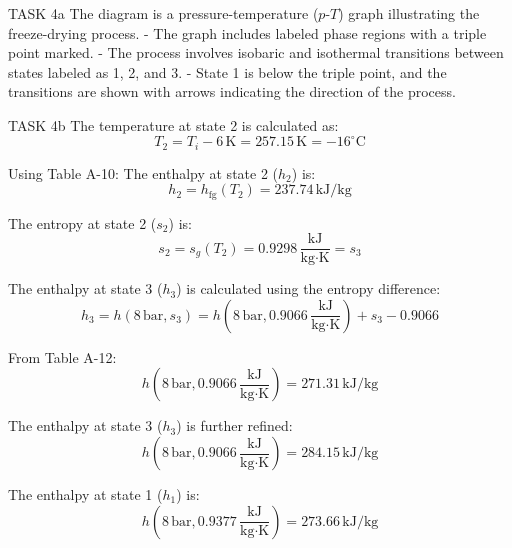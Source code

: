 TASK 4a  
The diagram is a pressure-temperature (\(p\)-\(T\)) graph illustrating the freeze-drying process.  
- The graph includes labeled phase regions with a triple point marked.  
- The process involves isobaric and isothermal transitions between states labeled as 1, 2, and 3.  
- State 1 is below the triple point, and the transitions are shown with arrows indicating the direction of the process.  

TASK 4b  
The temperature at state 2 is calculated as:  
\[
T_2 = T_i - 6 \, \text{K} = 257.15 \, \text{K} = -16^\circ\text{C}
\]

Using Table A-10:  
The enthalpy at state 2 (\(h_2\)) is:  
\[
h_2 = h_{\text{fg}}(T_2) = 237.74 \, \text{kJ/kg}
\]

The entropy at state 2 (\(s_2\)) is:  
\[
s_2 = s_g(T_2) = 0.9298 \, \frac{\text{kJ}}{\text{kg·K}} = s_3
\]

The enthalpy at state 3 (\(h_3\)) is calculated using the entropy difference:  
\[
h_3 = h(8 \, \text{bar}, s_3) = h(8 \, \text{bar}, 0.9066 \, \frac{\text{kJ}}{\text{kg·K}}) + s_3 - 0.9066
\]

From Table A-12:  
\[
h(8 \, \text{bar}, 0.9066 \, \frac{\text{kJ}}{\text{kg·K}}) = 271.31 \, \text{kJ/kg}
\]

The enthalpy at state 3 (\(h_3\)) is further refined:  
\[
h(8 \, \text{bar}, 0.9066 \, \frac{\text{kJ}}{\text{kg·K}}) = 284.15 \, \text{kJ/kg}
\]

The enthalpy at state 1 (\(h_1\)) is:  
\[
h(8 \, \text{bar}, 0.9377 \, \frac{\text{kJ}}{\text{kg·K}}) = 273.66 \, \text{kJ/kg}
\]